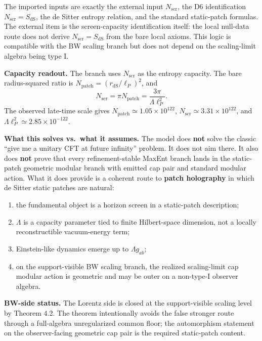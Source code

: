 The imported inputs are exactly the external input \(N_{\mathrm{scr}}\), the D6 identification
\(N_{\mathrm{scr}}=S_{\mathrm{dS}}\), the de Sitter entropy relation, and the standard static-patch
formulas. The external item is the screen-capacity identification itself: the local null-data
route does not derive \(N_{\mathrm{scr}}=S_{\mathrm{dS}}\) from the bare local axioms. This
logic is compatible with the BW scaling branch but does not depend on the scaling-limit algebra
being type I.

\textbf{Capacity readout.} The branch uses \(N_{\mathrm{scr}}\) as the entropy capacity. The
bare radius-squared ratio is \(N_{\mathrm{patch}}=(r_{\mathrm{dS}}/\ell_P)^2\), and
\[
N_{\mathrm{scr}}=\pi N_{\mathrm{patch}}
=\frac{3\pi}{\Lambda\ell_P^2}.
\]
The observed late-time scale gives \(N_{\mathrm{patch}}\simeq1.05\times10^{122}\),
\(N_{\mathrm{scr}}\simeq3.31\times10^{122}\), and
\(\Lambda\ell_P^2\simeq2.85\times10^{-122}\).

\textbf{What this solves vs.\ what it assumes.} The model does \textbf{not} solve the classic ``give me a unitary CFT at future infinity'' problem. It does not aim there. It also does \textbf{not} prove that every refinement-stable MaxEnt branch lands in the static-patch geometric modular branch with emitted cap pair and standard modular action. What it does provide is a coherent route to \textbf{patch holography} in which de Sitter static patches are natural:
\begin{enumerate}
\def\labelenumi{\arabic{enumi}.}
\item
the fundamental object is a horizon screen in a static-patch description;
\item
\(\Lambda\) is a capacity parameter tied to finite Hilbert-space dimension, not a locally reconstructible vacuum-energy term;
\item
Einstein-like dynamics emerge up to \(\Lambda g_{ab}\);
\item
on the support-visible BW scaling branch, the realized scaling-limit cap modular action is geometric and may be outer on a non-type-I observer algebra.
\end{enumerate}

\textbf{BW-side status.} The Lorentz side is closed at the support-visible scaling level by Theorem 4.2. The theorem intentionally avoids the false stronger route through a full-algebra unregularized common floor; the automorphism statement on the observer-facing geometric cap pair is the required static-patch content.

